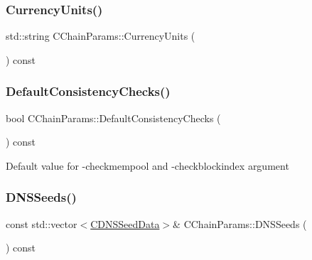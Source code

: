 \mbox{\label{class_c_chain_params_a3a925294bd23ce6a3765fdbd768632e4}} 
\subsubsection{\texorpdfstring{Currency\+Units()}{CurrencyUnits()}}
{\footnotesize\ttfamily std\+::string C\+Chain\+Params\+::\+Currency\+Units (\begin{DoxyParamCaption}{ }\end{DoxyParamCaption}) const\hspace{0.3cm}{\ttfamily [inline]}}

\mbox{\label{class_c_chain_params_a1d12f9b4b1ea7d7a0416cb6045496342}} 
\subsubsection{\texorpdfstring{Default\+Consistency\+Checks()}{DefaultConsistencyChecks()}}
{\footnotesize\ttfamily bool C\+Chain\+Params\+::\+Default\+Consistency\+Checks (\begin{DoxyParamCaption}{ }\end{DoxyParamCaption}) const\hspace{0.3cm}{\ttfamily [inline]}}

Default value for -\/checkmempool and -\/checkblockindex argument \mbox{\label{class_c_chain_params_a402b8df138b265619217ddf934bbc67a}} 
\subsubsection{\texorpdfstring{D\+N\+S\+Seeds()}{DNSSeeds()}}
{\footnotesize\ttfamily const std\+::vector$<$\mbox{\hyperlink{struct_c_d_n_s_seed_data}{C\+D\+N\+S\+Seed\+Data}}$>$\& C\+Chain\+Params\+::\+D\+N\+S\+Seeds (\begin{DoxyParamCaption}{ }\end{DoxyParamCaption}) const\hspace{0.3cm}{\ttfamily [inline]}}

